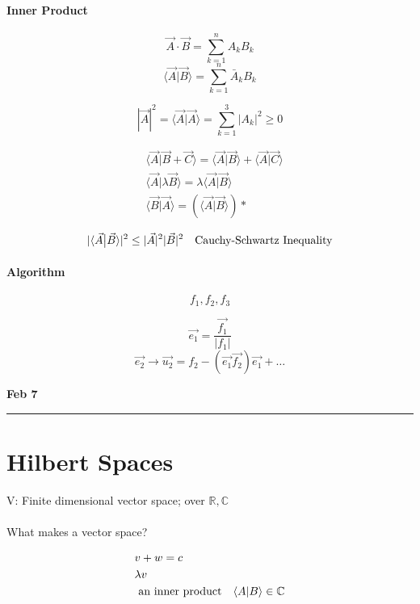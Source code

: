 \documentclass[svgnames]{article}   	%
\begin{document}
\paragraph{Inner Product} 

\[
  \vec{A} \cdot \vec{B} = \sum_{k=1}^{n} A_k B_k 
\]
\[
\langle \vec{A} \big| \vec{B} \rangle = \sum_{k=1}^{n} \bar A_k B_k
\]

\[
|\vec{A}|^2 = \langle \vec{A} \big| \vec{A} \rangle = \sum_{k=1}^{3} |A_k|^2 \geq 0 
\]

\begin{align*}
  &\langle \vec{A} \big| \vec{B} + \vec{C} \rangle = \langle \vec{A} \big|
  \vec{B}\rangle + \langle \vec{A} \big| \vec{C}\rangle \\
  &\langle \vec{A} \big| \lambda \vec{B} \rangle = \lambda \langle \vec{A}
  \big| \vec{B} \rangle \\
  & \langle \vec{B} \big| \vec{A} \rangle = (\langle \vec{A} \big| \vec{B}
  \rangle )\ast
\end{align*}

\begin{align*}
  |\langle \vec{A} \big| \vec{B} \rangle |^2 \leq |\vec{A}|^2 |\vec{B}|^2 \hspace{10px}
  \text{Cauchy-Schwartz Inequality}
\end{align*}

\paragraph{Algorithm}

\[
f_1, f_2, f_3
\]

 \[
\vec{e_1} = \frac{\vec{f_1}}{|f_1|} 
\]
\[
\vec{e_2} \rightarrow \vec{u_2} = f_2 - (\vec{e_1}\vec{f_2})\vec{e_1} + \dots
\]

\newpage
\noindent \textbf{Feb 7} \hrule
\vspace{10px}
\section{Hilbert Spaces}

V: Finite dimensional vector space; over $\mathbb{R}, \mathbb{C}$
\mbox{} \\\\
What makes a vector space? 

\begin{align*}
  &v + w = c \\
  &\lambda v \\
  &\text{ an inner product} \hspace{10px} \langle A | B \rangle \in \mathbb{C}
\end{align*}
\end{document}
